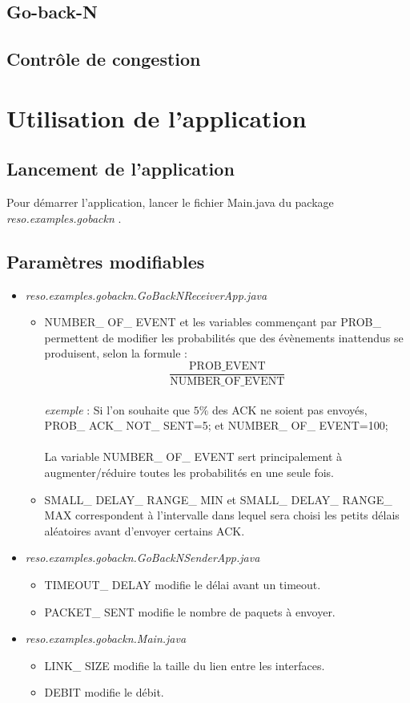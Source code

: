 \documentclass[]{article}
\begin{document}
\subsection{Go-back-N}
\subsection{Contrôle de congestion}
\section{Utilisation de l'application}
\subsection{Lancement de l'application}
Pour démarrer l'application, lancer le fichier Main.java du package \emph{reso.examples.gobackn}  .
\subsection{Paramètres modifiables}
\begin{itemize}
\item \emph{reso.examples.gobackn.GoBackNReceiverApp.java}
\begin{itemize}
\item NUMBER\_ OF\_ EVENT et les variables commençant par PROB\_ permettent de modifier les probabilités que des évènements inattendus se produisent, selon la formule : \[\frac{\text{PROB\_ EVENT}}{\text{NUMBER\_ OF\_ EVENT}}\]\\
\emph{exemple} : Si l'on souhaite que $5\%$ des ACK ne soient pas envoyés,\\ PROB\_ ACK\_ NOT\_ SENT=5; et NUMBER\_ OF\_ EVENT=100;\\\\
La variable NUMBER\_ OF\_ EVENT sert principalement à augmenter/réduire toutes les probabilités en une seule fois.
\item SMALL\_ DELAY\_ RANGE\_ MIN et SMALL\_ DELAY\_ RANGE\_ MAX correspondent à l'intervalle dans lequel sera choisi les petits délais aléatoires avant d'envoyer certains ACK.\\
\end{itemize}
\item \emph{reso.examples.gobackn.GoBackNSenderApp.java}
\begin{itemize}
\item TIMEOUT\_ DELAY modifie le délai avant un timeout.
\item PACKET\_ SENT modifie le nombre de paquets à envoyer.
\end{itemize}
\item \emph{reso.examples.gobackn.Main.java}
\begin{itemize}
\item LINK\_ SIZE modifie la taille du lien entre les interfaces.
\item DEBIT modifie le débit.
\end{itemize}
\end{itemize}
\end{document}
